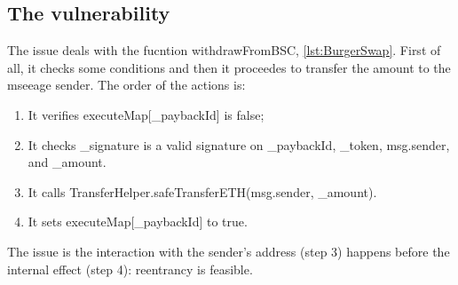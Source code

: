 \subsection{The vulnerability}
\label{sec:BurgerSwap:Vulnerability}

The issue deals with the fucntion withdrawFromBSC, \autoref{lst:BurgerSwap}. 
First of all, it checks some conditions and then it proceedes to transfer the amount to the mseeage sender. 
The order of the actions is:
\begin{enumerate}
    \item It verifies executeMap[\_paybackId] is false;
    \item It checks \_signature is a valid signature on \_paybackId, \_token, msg.sender, and \_amount.
    \item It calls TransferHelper.safeTransferETH(msg.sender, \_amount).
    \item It sets executeMap[\_paybackId] to true.
\end{enumerate}

The issue is the interaction with the sender's address (step 3) happens before the internal effect (step 4): reentrancy is feasible.

